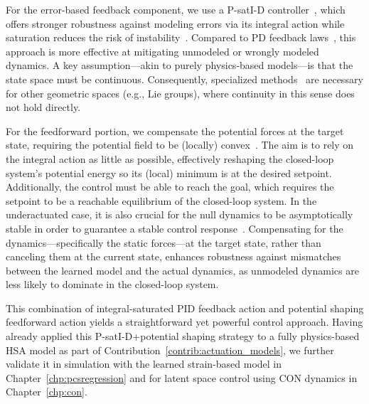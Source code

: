 For the error-based feedback component, we use a P-satI-D controller~\citep{pustina2022p}, which offers stronger robustness against modeling errors via its integral action while saturation reduces the risk of instability~\citep{pustina2022p}. Compared to PD feedback laws~\citep{della2020model}, this approach is more effective at mitigating unmodeled or wrongly modeled dynamics.
%
A key assumption—akin to purely physics-based models—is that the state space must be continuous. Consequently, specialized methods~\citep{maithripala2015intrinsic} are necessary for other geometric spaces (e.g., Lie groups), where continuity in this sense does not hold directly.

For the feedforward portion, we compensate the potential forces at the target state, requiring the potential field to be (locally) convex~\citep{borja2022energy, della2023model}. The aim is to rely on the integral action as little as possible, effectively reshaping the closed-loop system’s potential energy so its (local) minimum is at the desired setpoint. 
Additionally, the control must be able to reach the goal, which requires the setpoint to be a reachable equilibrium of the closed-loop system. In the underactuated case, it is also crucial for the null dynamics to be asymptotically stable in order to guarantee a stable control response~\citep{borja2022energy}.
Compensating for the dynamics—specifically the static forces—at the target state, rather than canceling them at the current state, enhances robustness against mismatches between the learned model and the actual dynamics, as unmodeled dynamics are less likely to dominate in the closed-loop system.

This combination of integral-saturated PID feedback action and potential shaping feedforward action yields a straightforward yet powerful control approach.
%
Having already applied this P-satI-D+potential shaping strategy to a fully physics-based \gls{HSA} model as part of Contribution~\ref{contrib:actuation_models}, we further validate it in simulation with the learned strain-based model in Chapter~\ref{chp:pcsregression} and for latent space control using \gls{CON} dynamics in Chapter~\ref{chp:con}.


